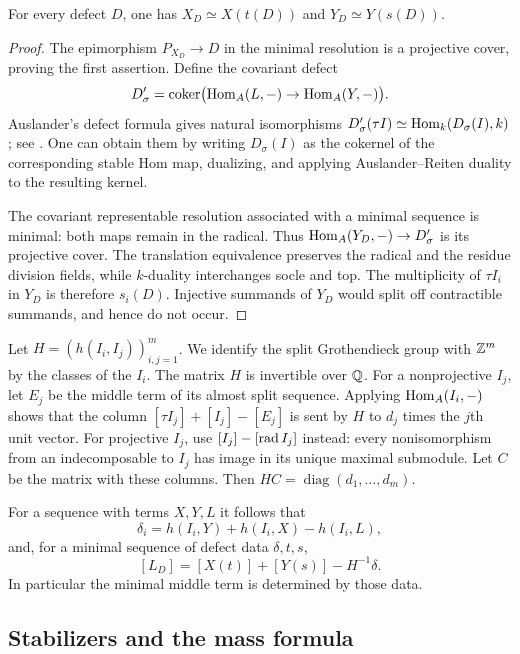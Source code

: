 \begin{lemma}\label{lem:ends}
For every defect $D$, one has $X_D\simeq X(t(D))$ and $Y_D\simeq Y(s(D))$.
\end{lemma}
\begin{proof}
The epimorphism $P_{X_D}\to D$ in the minimal resolution is a projective cover, proving the first assertion. Define the covariant defect
\[
 D'_\sigma=\operatorname{coker}\bigl(\operatorname{Hom}_A(L,-)\to\operatorname{Hom}_A(Y,-)\bigr).
\]
Auslander's defect formula gives natural isomorphisms
$D'_\sigma(\tau I)\simeq\operatorname{Hom}_k(D_\sigma(I),k)$; see \cite[Proposition 2.5]{Jiao}. One can obtain them by writing $D_\sigma(I)$ as the cokernel of the corresponding stable Hom map, dualizing, and applying Auslander--Reiten duality to the resulting kernel.

The covariant representable resolution associated with a minimal sequence is minimal: both maps remain in the radical. Thus $\operatorname{Hom}_A(Y_D,-)\to D'_\sigma$ is its projective cover. The translation equivalence preserves the radical and the residue division fields, while $k$-duality interchanges socle and top. The multiplicity of $\tau I_i$ in $Y_D$ is therefore $s_i(D)$. Injective summands of $Y_D$ would split off contractible summands, and hence do not occur.
\end{proof}

Let $H=(h(I_i,I_j))_{i,j=1}^m$. We identify the split Grothendieck group with $\mathbb Z^m$ by the classes of the $I_i$. The matrix $H$ is invertible over $\mathbb Q$. For a nonprojective $I_j$, let $E_j$ be the middle term of its almost split sequence. Applying $\operatorname{Hom}_A(I_i,-)$ shows that the column
$[\tau I_j]+[I_j]-[E_j]$ is sent by $H$ to $d_j$ times the $j$th unit vector. For projective $I_j$, use $[I_j]-[\operatorname{rad} I_j]$ instead: every nonisomorphism from an indecomposable to $I_j$ has image in its unique maximal submodule. Let $C$ be the matrix with these columns. Then $HC=\operatorname{diag}(d_1,\ldots,d_m)$.

For a sequence with terms $X,Y,L$ it follows that
\begin{equation}\label{eq:defdim}
 \delta_i=h(I_i,Y)+h(I_i,X)-h(I_i,L),
\end{equation}
and, for a minimal sequence of defect data $\delta,t,s$,
\begin{equation}\label{eq:middleterm}
 [L_D]=[X(t)]+[Y(s)]-H^{-1}\delta.
\end{equation}
In particular the minimal middle term is determined by those data.

\subsection{Stabilizers and the mass formula}

